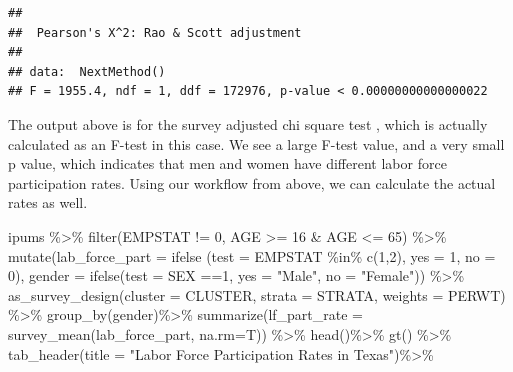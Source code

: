 \documentclass[
]{article}
\newenvironment{Shaded}{\begin{snugshade}}{\end{snugshade}}
\newcommand{\AttributeTok}[1]{\textcolor[rgb]{0.77,0.63,0.00}{#1}}
\newcommand{\DecValTok}[1]{\textcolor[rgb]{0.00,0.00,0.81}{#1}}
\newcommand{\FunctionTok}[1]{\textcolor[rgb]{0.00,0.00,0.00}{#1}}
\newcommand{\NormalTok}[1]{#1}
\newcommand{\SpecialCharTok}[1]{\textcolor[rgb]{0.00,0.00,0.00}{#1}}
\newcommand{\StringTok}[1]{\textcolor[rgb]{0.31,0.60,0.02}{#1}}
\begin{document}
\begin{verbatim}
## 
##  Pearson's X^2: Rao & Scott adjustment
## 
## data:  NextMethod()
## F = 1955.4, ndf = 1, ddf = 172976, p-value < 0.00000000000000022
\end{verbatim}

The output above is for the survey adjusted chi square test \citep{rao_chi-squared_1984}, which is actually calculated as an F-test in this case. We see a large F-test value, and a very small p value, which indicates that men and women have different labor force participation rates. Using our workflow from above, we can calculate the actual rates as well.

\begin{Shaded}
\begin{Highlighting}[]
\NormalTok{ipums }\SpecialCharTok{\%\textgreater{}\%}
  \FunctionTok{filter}\NormalTok{(EMPSTAT }\SpecialCharTok{!=} \DecValTok{0}\NormalTok{,}
\NormalTok{         AGE }\SpecialCharTok{\textgreater{}=} \DecValTok{16} \SpecialCharTok{\&}\NormalTok{ AGE }\SpecialCharTok{\textless{}=} \DecValTok{65}\NormalTok{) }\SpecialCharTok{\%\textgreater{}\%}
  \FunctionTok{mutate}\NormalTok{(}\AttributeTok{lab\_force\_part =} \FunctionTok{ifelse}\NormalTok{ (}\AttributeTok{test =}\NormalTok{ EMPSTAT }\SpecialCharTok{\%in\%} \FunctionTok{c}\NormalTok{(}\DecValTok{1}\NormalTok{,}\DecValTok{2}\NormalTok{),}
                                  \AttributeTok{yes =} \DecValTok{1}\NormalTok{,}
                                  \AttributeTok{no =} \DecValTok{0}\NormalTok{), }
         \AttributeTok{gender =} \FunctionTok{ifelse}\NormalTok{(}\AttributeTok{test =}\NormalTok{ SEX }\SpecialCharTok{==}\DecValTok{1}\NormalTok{,}
                         \AttributeTok{yes =} \StringTok{"Male"}\NormalTok{,}
                         \AttributeTok{no =} \StringTok{"Female"}\NormalTok{)) }\SpecialCharTok{\%\textgreater{}\%}
  \FunctionTok{as\_survey\_design}\NormalTok{(}\AttributeTok{cluster =}\NormalTok{ CLUSTER,}
                   \AttributeTok{strata =}\NormalTok{ STRATA,}
                   \AttributeTok{weights =}\NormalTok{ PERWT) }\SpecialCharTok{\%\textgreater{}\%}
  \FunctionTok{group\_by}\NormalTok{(gender)}\SpecialCharTok{\%\textgreater{}\%}
  \FunctionTok{summarize}\NormalTok{(}\AttributeTok{lf\_part\_rate =} \FunctionTok{survey\_mean}\NormalTok{(lab\_force\_part, }\AttributeTok{na.rm=}\NormalTok{T)) }\SpecialCharTok{\%\textgreater{}\%}  
  \FunctionTok{head}\NormalTok{()}\SpecialCharTok{\%\textgreater{}\%}
  \FunctionTok{gt}\NormalTok{() }\SpecialCharTok{\%\textgreater{}\%}
    \FunctionTok{tab\_header}\NormalTok{(}\AttributeTok{title =} \StringTok{"Labor Force Participation Rates in Texas"}\NormalTok{)}\SpecialCharTok{\%\textgreater{}\%}

\end{Highlighting}
\end{Shaded}
\end{document}
